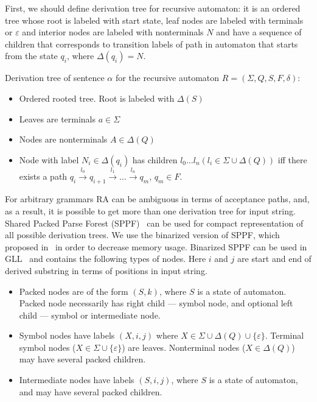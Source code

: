 \documentclass[runningheads,a4paper]{llncs}
\begin{document}
First, we should define derivation tree for recursive automaton: it is an ordered tree whose root is labeled with start state,
leaf nodes are labeled with terminals or $\varepsilon$ and interior nodes are labeled with 
nonterminals $N$ and have a sequence of children that corresponds to transition labels of path in 
automaton that starts from the state $q_i$, where $ \Delta(q_i) = N $.

\begin{mydef}

Derivation tree of sentence $\alpha$ for the recursive automaton $R=(\Sigma, Q, S, F, \delta)$:%

\begin{itemize}
\item Ordered rooted tree. Root is labeled with $\Delta(S)$
\item Leaves are terminals $a\in \Sigma$
\item Nodes are nonterminals $A\in \Delta(Q)$
\item Node with label $N_i \in \Delta(q_i)$ has children $l_0 \dots l_n (l_i \in \Sigma \cup \Delta(Q))$ iff there exists a
path
$q_i \xrightarrow[]{l_0} q_{i+1} \xrightarrow[]{l_1} \dots \xrightarrow{l_n} q_m$, $q_m \in F$. 
\end{itemize}

\end{mydef}

For arbitrary grammars RA can be ambiguous in terms of acceptance paths, and, as a result, it is possible to get more than one derivation tree for input string.
Shared Packed Parse Forest (SPPF)~\cite{SPPF} can be used for compact representation of all possible derivation trees.
We use the binarized version of SPPF, which proposed in~\cite{brnglr} in order to decrease memory usage.
Binarized SPPF can be used in GLL~\cite{scott2013gll} and contains the following types of nodes.
Here $i$ and $j$ are start and end of derived substring in terms of positions in input string.

\begin{itemize}
\item Packed nodes are of the form $(S, k)$, where $S$ is a state of automaton. Packed node necessarily has right child --- symbol node, and optional left child --- symbol or intermediate node.
\item Symbol nodes have labels $(X, i, j)$ where $X \in \Sigma \cup \Delta(Q) \cup \{\varepsilon\}$.
Terminal symbol nodes ($X \in \Sigma \cup \{\varepsilon\}$) are leaves. 
Nonterminal nodes ($X \in \Delta(Q)$) may have several packed children. 
\item Intermediate nodes have labels $ (S, i, j) $, where $S$ is a state of automaton, and may have several packed children. 
\end{itemize}
\end{document}
